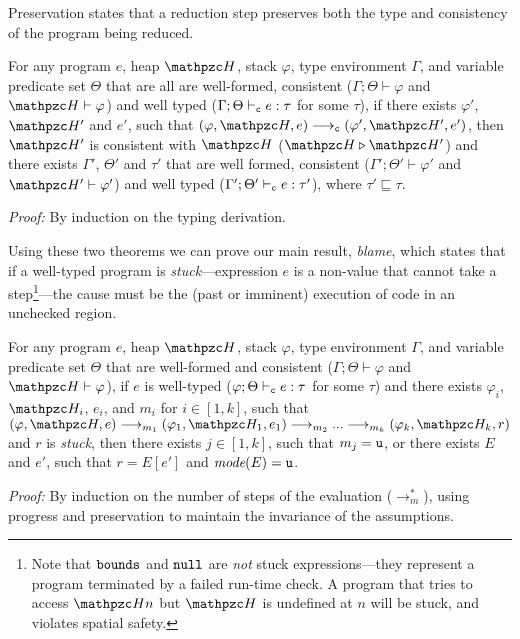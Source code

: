 \noindent
Preservation states that a reduction step preserves both the
type and consistency of the program being reduced.

\begin{thm}[Preservation]
For any \checkedc program $e$, heap $\heap$, stack
$\varphi$, type environment $\Gamma$, and variable predicate set $\Theta$
that are all are well-formed, consistent
($\Gamma;\Theta\vdash \varphi$ and $\heap \vdash \varphi$) and well
typed ($\Gamma;\Theta\vdash_{\texttt{c}} e : \tau$ for some $\tau$), if there exists $\varphi'$,
$\heap'$ and $e'$, such that $(\varphi,\heap,e)
\longrightarrow_{\cmode} (\varphi',\heap',e')$, then $\heap'$ is
consistent with $\heap$ ($\heap \triangleright \heap'$) and there exists
$\Gamma'$, $\Theta'$ and $\tau'$ that are well formed, consistent
($\Gamma';\Theta'\vdash \varphi'$ and $\heap' \vdash \varphi'$) and
well typed ($\Gamma';\Theta' \vdash_{\texttt{c}} e: \tau'$), where
$\tau'\sqsubseteq \tau$.
\end{thm}
{\em Proof:} By induction on the typing derivation.
\smallskip

Using these two theorems we can prove our main result, {\em blame},
which states that
  if a well-typed program is \emph{stuck}---expression
$e$ is a non-value that cannot take a step\footnote{Note that
  $\mathtt{bounds}$ and $\mathtt{null}$ are \emph{not} stuck expressions---they represent a
  program terminated by a failed run-time check. A program that tries to access $\heap{n}$
  but $\heap$ is undefined at $n$ will be stuck, and violates spatial
  safety.}---the cause must be the
(past or imminent) execution of code in an unchecked region.


\begin{thm}\label{thm:blame} For any \checkedc
  program $e$, heap $\heap$, stack
$\varphi$, type environment $\Gamma$, and variable predicate set $\Theta$
that are well-formed and consistent
($\Gamma;\Theta\vdash \varphi$ and $\heap \vdash \varphi$),
if $e$ is well-typed ($\varphi;\Theta\vdash_{\texttt{c}} e :
\tau$ for some $\tau$) and there exists
$\varphi_i$, $\heap_i$, $e_i$, and $m_i$ for $i\in [1,k]$, such that
$(\varphi,\heap,e) \longrightarrow_{m_1} (\varphi_1,\heap_1,e_1)\longrightarrow_{m_2} ...\longrightarrow_{m_k} (\varphi_k,\heap_k,r)$ and $r$ is \emph{stuck}, then
there exists $j \in [1,k]$, such that $m_j = \texttt{u}$, or there exists $E$ and $e'$, such that $r = E[e']$ and $\textit{mode}(E) = \texttt{u}$.
\end{thm}
{\em Proof:} By induction on the number of steps of the \checkedc
evaluation ($\longrightarrow_m^*$), using progress and preservation to
maintain the invariance of the assumptions.


